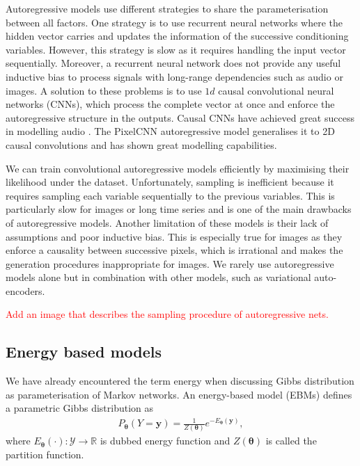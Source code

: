 Autoregressive models use different strategies to share the parameterisation between all factors. One strategy is to use recurrent neural networks where the hidden vector carries and updates the information of the successive conditioning variables\citep{van2016pixel}. However, this strategy is slow as it requires handling the input vector sequentially. Moreover, a recurrent neural network does not provide any useful inductive bias to process signals with long-range dependencies such as audio or images. A solution to these problems is to use $1d$ causal convolutional neural networks (CNNs), which process the complete vector at once and enforce the autoregressive structure in the outputs. Causal CNNs have achieved great success in modelling audio \citep{van_den_oord_wavenet_2016, van_den_oord_parallel_2018}. The PixelCNN autoregressive model generalises it to 2D causal convolutions and has shown great modelling capabilities\citep{oord_conditional_2016}.

We can train convolutional autoregressive models efficiently by maximising their likelihood under the dataset. Unfortunately, sampling is inefficient because it requires sampling each variable sequentially to the previous variables. This is particularly slow for images or long time series and is one of the main drawbacks of autoregressive models. Another limitation of these models is their lack of assumptions and poor inductive bias. This is especially true for images as they enforce a causality between successive pixels, which is irrational and makes the generation procedures inappropriate for images. We rarely use autoregressive models alone but in combination with other models, such as variational auto-encoders.

\textcolor{red}{Add an image that describes the sampling procedure of autoregressive nets.}
\subsection{Energy based models}
We have already encountered the term energy when discussing Gibbs distribution as parameterisation of Markov networks. An energy-based model (EBMs)  defines a parametric Gibbs distribution as
\begin{align}
  P_{\bm{\theta}}(Y=\bm{y}) = \frac{1}{Z(\bm{\theta})} e^{-E_{\bm{\theta}}(\bm{y})},
\end{align}
where $E_{\bm{\theta}}(\cdot): \mathcal{Y}\rightarrow \mathbb{R}$ is dubbed energy function and $Z(\bm{\theta})$ is called the partition function.

